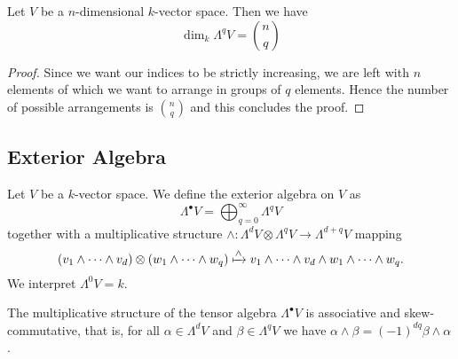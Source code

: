 \begin{proposition}
Let \(V\) be a \(n\)-dimensional \(k\)-vector space. Then we have
\[
  \dim_k \Lambda^q V = \binom n q
\]
\end{proposition}

\begin{proof}
Since we want our indices to be strictly increasing, we are left with \(n\)
elements of which we want to arrange in groups of \(q\) elements. Hence the
number of possible arrangements is \(\binom n q\) and this concludes the
proof.
\end{proof}

\subsection{Exterior Algebra}

\begin{definition}
\label{def: exterior algebra}
Let \(V\) be a \(k\)-vector space. We define the exterior algebra on \(V\) as
\[
  \Lambda^\bullet V = \bigoplus_{q=0}^\infty \Lambda^q V
\]
together with a multiplicative structure \(\wedge: \Lambda^d V \otimes
\Lambda^q V \to \Lambda^{d+q} V\) mapping
\[
  (v_1 \wedge \dots \wedge v_d) \otimes (w_1 \wedge \dots \wedge w_q) \xmapsto
  \wedge v_1 \wedge \dots \wedge v_d \wedge w_1 \wedge \dots \wedge w_q.
\]
We interpret \(\Lambda^0 V = k\).
\end{definition}

\begin{proposition}\label{prop:exterior-algebra-associative-skew-commutative}
The multiplicative structure of the tensor algebra \(\Lambda^\bullet V\) is
associative and skew-commutative, that is, for all \(\alpha \in \Lambda^d V\)
and \(\beta \in \Lambda^q V\) we have \(\alpha \wedge \beta = (-1)^{d q} \beta
\wedge \alpha\).
\end{proposition}

